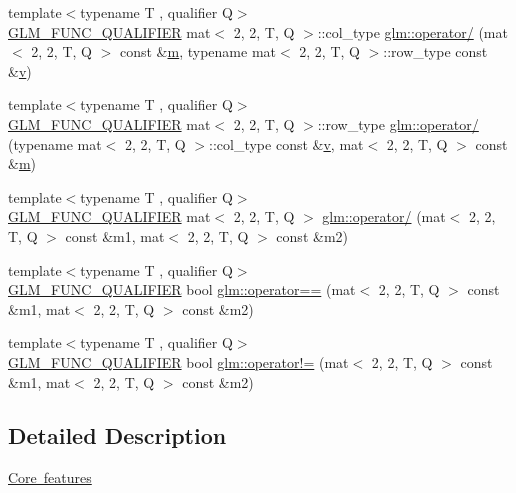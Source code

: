 \begin{DoxyCompactItemize}
\item 
{\footnotesize template$<$typename T , qualifier Q$>$ }\\\mbox{\hyperlink{setup_8hpp_a33fdea6f91c5f834105f7415e2a64407}{G\+L\+M\+\_\+\+F\+U\+N\+C\+\_\+\+Q\+U\+A\+L\+I\+F\+I\+ER}} mat$<$ 2, 2, T, Q $>$\+::col\+\_\+type \mbox{\hyperlink{namespaceglm_a1371d2a3e665b5d05d78e7508cac0666}{glm\+::operator/}} (mat$<$ 2, 2, T, Q $>$ const \&\mbox{\hyperlink{_s_d_l__opengl__glext_8h_af593500c283bf1a787a6f947f503a5c2}{m}}, typename mat$<$ 2, 2, T, Q $>$\+::row\+\_\+type const \&\mbox{\hyperlink{_s_d_l__opengl_8h_a10a82eabcb59d2fcd74acee063775f90}{v}})
\item 
{\footnotesize template$<$typename T , qualifier Q$>$ }\\\mbox{\hyperlink{setup_8hpp_a33fdea6f91c5f834105f7415e2a64407}{G\+L\+M\+\_\+\+F\+U\+N\+C\+\_\+\+Q\+U\+A\+L\+I\+F\+I\+ER}} mat$<$ 2, 2, T, Q $>$\+::row\+\_\+type \mbox{\hyperlink{namespaceglm_a4c38c0b03a459b89203c68cebaa2ab79}{glm\+::operator/}} (typename mat$<$ 2, 2, T, Q $>$\+::col\+\_\+type const \&\mbox{\hyperlink{_s_d_l__opengl_8h_a10a82eabcb59d2fcd74acee063775f90}{v}}, mat$<$ 2, 2, T, Q $>$ const \&\mbox{\hyperlink{_s_d_l__opengl__glext_8h_af593500c283bf1a787a6f947f503a5c2}{m}})
\item 
{\footnotesize template$<$typename T , qualifier Q$>$ }\\\mbox{\hyperlink{setup_8hpp_a33fdea6f91c5f834105f7415e2a64407}{G\+L\+M\+\_\+\+F\+U\+N\+C\+\_\+\+Q\+U\+A\+L\+I\+F\+I\+ER}} mat$<$ 2, 2, T, Q $>$ \mbox{\hyperlink{namespaceglm_a952a07cc4b69739af33e4531085a9cbf}{glm\+::operator/}} (mat$<$ 2, 2, T, Q $>$ const \&m1, mat$<$ 2, 2, T, Q $>$ const \&m2)
\item 
{\footnotesize template$<$typename T , qualifier Q$>$ }\\\mbox{\hyperlink{setup_8hpp_a33fdea6f91c5f834105f7415e2a64407}{G\+L\+M\+\_\+\+F\+U\+N\+C\+\_\+\+Q\+U\+A\+L\+I\+F\+I\+ER}} bool \mbox{\hyperlink{namespaceglm_a82a69bca4c840fba89832e0175eec274}{glm\+::operator==}} (mat$<$ 2, 2, T, Q $>$ const \&m1, mat$<$ 2, 2, T, Q $>$ const \&m2)
\item 
{\footnotesize template$<$typename T , qualifier Q$>$ }\\\mbox{\hyperlink{setup_8hpp_a33fdea6f91c5f834105f7415e2a64407}{G\+L\+M\+\_\+\+F\+U\+N\+C\+\_\+\+Q\+U\+A\+L\+I\+F\+I\+ER}} bool \mbox{\hyperlink{namespaceglm_aff8daab6db273abada3e120aedd93499}{glm\+::operator!=}} (mat$<$ 2, 2, T, Q $>$ const \&m1, mat$<$ 2, 2, T, Q $>$ const \&m2)
\end{DoxyCompactItemize}


\subsection{Detailed Description}
\mbox{\hyperlink{group__core}{Core features}} 